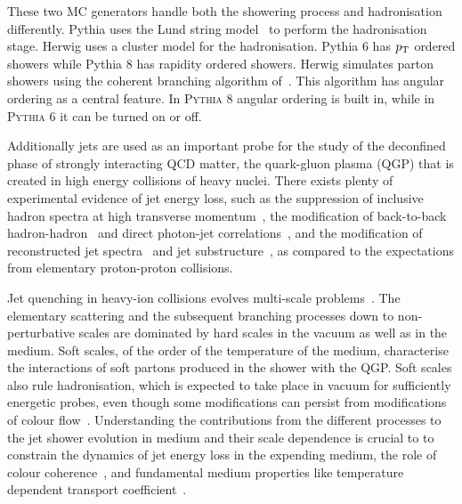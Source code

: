 These two MC generators handle both the showering process and hadronisation differently. Pythia uses the Lund string model~\cite{lundString} to perform the hadronisation stage. Herwig uses a cluster model for the hadronisation. Pythia 6 has $p_{\rm T}$ ordered showers while Pythia 8 has rapidity ordered showers. Herwig simulates parton showers using the coherent branching algorithm of~\cite{Gieseke:2003rz}. This algorithm has angular ordering as a central feature. In \textsc{Pythia} 8 angular ordering is built in, while in \textsc{Pythia} 6 it can be turned on or off.

Additionally jets are used as an important probe for the study of the deconfined phase of strongly interacting QCD matter, the quark-gluon plasma (QGP) that is created in high energy collisions of heavy nuclei.
There exists plenty of experimental evidence of jet energy loss, such as the suppression of inclusive hadron spectra at high transverse momentum~\cite{Adcox:2001jp,Adams:2003im,Arsene:2003yk,Khachatryan:2016odn,Acharya:2018qsh}, the modification of back-to-back hadron-hadron~\cite{Adare:2007vu,Aamodt:2011vg} and direct photon-jet correlations~\cite{Adare:2012qi}, and the modification of reconstructed jet spectra~\cite{Adam:2015ewa} and jet substructure~\cite{Sirunyan:2018qec,Chatrchyan:2014ava,Acharya:2018uvf}, as compared to the expectations from elementary proton-proton collisions.

Jet quenching in heavy-ion collisions evolves multi-scale problems~\cite{Kurkela:2014tla,Tachibana:2018yae}. The elementary scattering and the subsequent branching processes down to non-perturbative scales are dominated by hard scales in the vacuum as well as in the medium. Soft scales, of the order of the temperature of the medium, characterise the interactions of soft partons produced in the shower with the QGP. Soft scales also rule hadronisation, which is expected to take place in vacuum for sufficiently energetic probes, even though some modifications can persist from modifications of colour flow~\cite{Aurenche:2011rd,Beraudo:2011bh,Beraudo:2012bq}. Understanding the contributions from the different processes to the jet shower evolution in medium and their scale dependence is crucial to to constrain the dynamics of jet energy loss in the expending medium, the role of colour coherence~\cite{CasalderreySolana:2012ef}, and fundamental medium properties like temperature dependent transport coefficient~\cite{DEramo:2012uzl,Ayala:2016pvm}.

